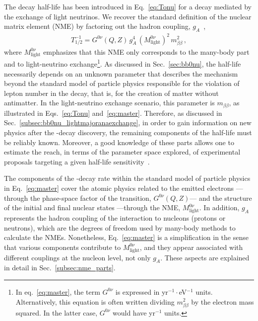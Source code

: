
The \bbonu decay half-life has been introduced in Eq.~\eqref{eq:Tonu} for a decay mediated by the exchange of light neutrinos. We recover the standard definition of the nuclear matrix element (NME) by factoring out the hadron coupling, $g_A$~\cite{Engel:2016xgb,Agostini:2022zub},
\begin{align}
T_{1/2}^{-1} =  G^{0\nu}\left(Q,Z\right)\,g_A^4\,\left(M^{0\nu}_\text{light}\right)^2\,m^2_{\beta\beta}\,,
\label{eq:master}
\end{align}
where $M^{0\nu}_\text{light}$ emphasizes that this NME only corresponds to the many-body part and to light-neutrino exchange\footnote{In eq.~\ref{eq:master}, the term $G^{0\nu}$ is expressed in yr$^{-1}\cdot$eV$^{-1}$ units. Alternatively, this equation is often written dividing $m^2_{\beta\beta}$ by the electron mass squared. In the latter case, $G^{0\nu}$ would have yr$^{-1}$ units.}.
As discussed in Sec.~\ref{sec:bb0nu}, the half-life necessarily depends on an unknown parameter that describes the mechanism beyond the standard model of particle physics responsible for the violation of lepton number in the decay, that is, for the creation of matter without antimatter. In the light-neutrino exchange scenario, this parameter is $m_{\beta\beta}$, as illustrated in Eqs.~\eqref{eq:Tonu} and~\eqref{eq:master}. Therefore, as discussed in Sec.~\ref{subsec:bb0nu_lightmajoranaexchange}, in order to gain information on new physics after the \bbonu-decay discovery, the remaining components of the half-life must be reliably known. Moreover, a good knowledge of these parts allows one to estimate the reach, in terms of the parameter space explored, of experimental proposals targeting a given half-life sensitivity~\cite{Agostini:2021kba}.

The components of the \bbonu-decay rate within the standard model of particle physics in Eq.~\eqref{eq:master} cover the atomic physics related to the emitted electrons ---through the phase-space factor of the transition, $G^{0\nu}\left(Q,Z\right)$--- and the structure of the initial and final nuclear states ---through the NME, $M^{0\nu}_\text{light}$. In addition, $g_A$ represents the hadron coupling of the interaction to nucleons (protons or neutrons), which are the degrees of freedom used by many-body methods to calculate the NMEs.
Nonetheless, Eq.~\eqref{eq:master} is a simplification in the sense that various components contribute to $M^{0\nu}_\text{light}$, and they appear associated with different couplings at the nucleon level, not only $g_A$. These aspects are explained in detail in Sec.~\ref{subsec:nme_parts}.

